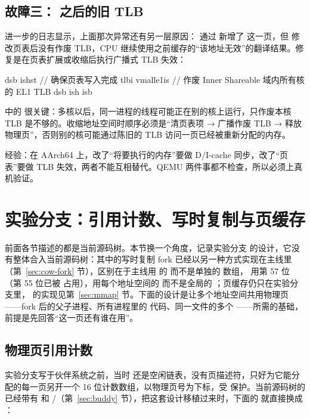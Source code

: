 \subsection{故障三： 之后的旧 TLB}

进一步的日志显示，上面那次异常还有另一层原因： 通过  新增了  这一页，但  修改页表后没有作废 TLB，CPU 继续使用之前缓存的“该地址无效”的翻译结果。修复是在页表扩展或收缩后执行广播式 TLB 失效：

\begin{asmcode}
        dsb  ishst          // 确保页表写入完成
        tlbi vmalle1is      // 作废 Inner Shareable 域内所有核的 EL1 TLB
        dsb  ish
        isb
\end{asmcode}

 中的  很关键：多核以后，同一进程的线程可能正在别的核上运行，只作废本核 TLB 是不够的。收缩地址空间时顺序必须是“清页表项 → 广播作废 TLB → 释放物理页”，否则别的核可能通过陈旧的 TLB 访问一页已经被重新分配的内存。

\begin{note}
  经验：在 AArch64 上，改了“将要执行的内存”要做 D/I-cache 同步，改了“页表”要做 TLB 失效，两者不能互相替代。QEMU 两件事都不检查，所以必须上真机验证。
\end{note}

\section{实验分支：引用计数、写时复制与页缓存}
\label{sec:sharedpages}

前面各节描述的都是当前源码树。本节换一个角度，记录实验分支  的设计，它没有整体合入当前源码树：其中的写时复制 fork 已经以另一种方式实现在主线里（第~\ref{sec:cow-fork} 节），区别在于主线用  的  而不是单独的  数组， 用第 57 位（第 55 位已被  占用），用每个地址空间的  而不是全局的 ；页缓存仍只在实验分支里， 的实现见第~\ref{sec:mmap} 节。下面的设计是让多个地址空间共用物理页——fork 后的父子进程、所有进程里的  代码、同一文件的多个 ——所需的基础，前提是先回答“这一页还有谁在用”。

\subsection{物理页引用计数}

实验分支写于伙伴系统之前，当时  还是空闲链表，没有页描述符，只好为它能分配的每一页另开一个 16 位计数数组，以物理页号为下标，受  保护。当前源码树的  已经带有  和 /（第~\ref{sec:buddy} 节），把这套设计移植过来时，下面的  就直接换成 ：

